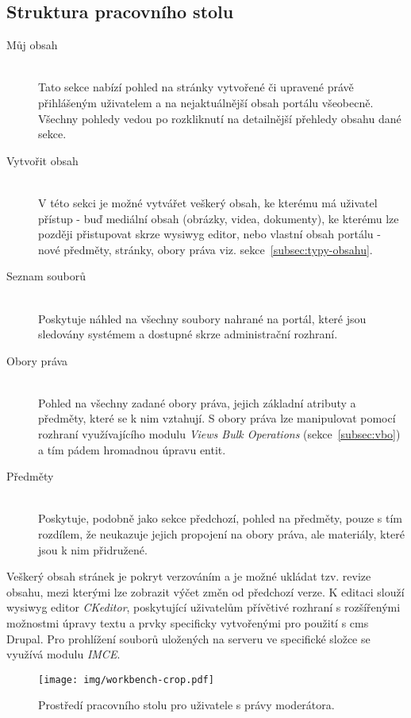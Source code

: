 \subsection*{Struktura pracovního stolu}
\begin{description}
  \item[Můj obsah] \hfill \\
  Tato sekce nabízí pohled na stránky vytvořené či upravené právě přihlášeným uživatelem a na nejaktuálnější obsah portálu všeobecně. Všechny pohledy vedou po rozkliknutí na detailnější přehledy obsahu dané sekce.  
  \item [Vytvořit obsah] \hfill \\
  V této sekci je možné vytvářet veškerý obsah, ke kterému má uživatel přístup - buď mediální obsah (obrázky, videa, dokumenty), ke kterému lze později přistupovat skrze \gls{wysiwyg} editor, nebo vlastní obsah portálu - nové předměty, stránky, obory práva viz. sekce~\ref{subsec:typy-obsahu}.
  \item [Seznam souborů] \hfill \\
  Poskytuje náhled na všechny soubory nahrané na portál, které jsou sledovány systémem a dostupné skrze administrační rozhraní.
  \item [Obory práva] \hfill \\
  Pohled na všechny zadané obory práva, jejich základní atributy a předměty, které se k nim vztahují. S obory práva lze manipulovat pomocí rozhraní využívajícího modulu \emph{Views Bulk Operations} (sekce~\ref{subsec:vbo}) a tím pádem hromadnou úpravu entit.
  \item [Předměty] \hfill \\
  Poskytuje, podobně jako sekce předchozí, pohled na předměty, pouze s tím rozdílem, že neukazuje jejich propojení na obory práva, ale materiály, které jsou k nim přidružené.
\end{description}

Veškerý obsah stránek je pokryt verzováním a je možné ukládat tzv. revize obsahu, mezi kterými lze zobrazit výčet změn od předchozí verze. K editaci slouží \gls{wysiwyg} editor \emph{CKeditor}, poskytující uživatelům přívětivé rozhraní s rozšířenými možnostmi úpravy textu a prvky specificky vytvořenými pro použití s \gls{cms} Drupal. Pro prohlížení souborů uložených na serveru ve specifické složce se využívá modulu \emph{IMCE}.

\begin{figure}[htp]
  \texttt{[image: img/workbench-crop.pdf]}
  \caption{Prostředí pracovního stolu pro uživatele s právy moderátora.}
  \label{fig:workbench}
\end{figure}  

